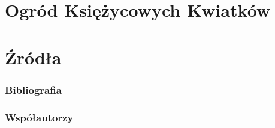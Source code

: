 \documentclass[]{coda-art}
\begin{document}





\clearpage\thispagestyle{akt}

\part{Ogród Księżycowych Kwiatków}
\label{akt:ogrod}






\clearpage\thispagestyle{akt}

\part{Źródła}
\label{akt:zrodla}






\clearpage\pagestyle{plain}

{}

\section*{Bibliografia}
\label{zal:bibliografia}

\ornamentbreak

\printbibliography[heading=none]



\clearpage\pagestyle{plain}

{}

\section*{Współautorzy}
\label{zal:wspolautorzy}

\ornamentbreak


\end{document}
